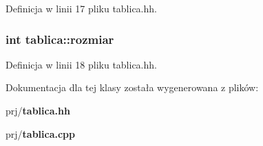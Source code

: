 \-Definicja w linii 17 pliku tablica.\-hh.

\subsubsection[{rozmiar}]{\setlength{\rightskip}{0pt plus 5cm}int {\bf tablica\-::rozmiar}\hspace{0.3cm}{\ttfamily  [private]}}\label{classtablica_a89cfeb12af90d90705924597f6286b2e}


\-Definicja w linii 18 pliku tablica.\-hh.



\-Dokumentacja dla tej klasy została wygenerowana z plików\-:\begin{DoxyCompactItemize}
\item 
prj/{\bf tablica.\-hh}\item 
prj/{\bf tablica.\-cpp}\end{DoxyCompactItemize}
